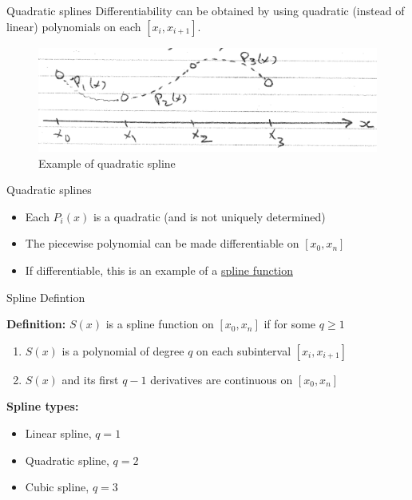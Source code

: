 \documentclass[12pt]{beamer}
\begin{document}
\begin{frame}{Quadratic splines}
Differentiability can be obtained by using quadratic (instead of linear) 
polynomials on each $[x_i, x_{i+1}]$. 


\begin{figure} 
  \centering
  \includegraphics[scale=0.5]{quadratic_splines}
  \caption{Example of quadratic spline}
  \label{fig:quad}
\end{figure}
\end{frame} 


\begin{frame}{Quadratic splines} 
\begin{itemize}
\item Each $P_i(x)$ is a quadratic (and is not uniquely determined) 
\item The piecewise polynomial can be made differentiable on $[x_0, x_n]$ 
\item If differentiable, this is an example of a \underline{spline function} 
\end{itemize}  

\end{frame}  

\begin{frame}{Spline Defintion} 

{\bf Definition:} 
$S(x)$ is a spline function on $[x_0, x_n]$ if for some $q \geq 1$ 
\begin{enumerate} 
\item $S(x)$ is a polynomial of degree $q$ on each subinterval $[x_i, x_{i+1}]$ 
\item $S(x)$ and its first $q-1$ derivatives are continuous on $[x_0, x_n]$ 
\end{enumerate}
\vspace{\baselineskip}
{\bf Spline types:}
\begin{itemize} 
\item Linear spline, $q=1$
\item Quadratic spline, $q=2$
\item Cubic spline, $q=3$
\end{itemize} 
\end{frame}
\end{document}

